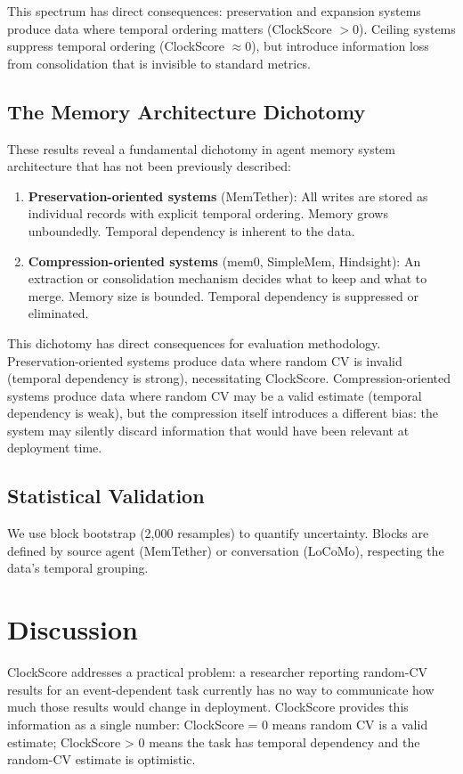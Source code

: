 \documentclass[sigconf,nonacm]{acmart}
\begin{document}
This spectrum has direct consequences: preservation and expansion systems produce data where temporal ordering matters (ClockScore $> 0$). Ceiling systems suppress temporal ordering (ClockScore $\approx 0$), but introduce information loss from consolidation that is invisible to standard metrics.

\subsection{The Memory Architecture Dichotomy}

These results reveal a fundamental dichotomy in agent memory system architecture that has not been previously described:

\begin{enumerate}
\item \textbf{Preservation-oriented systems} (MemTether): All writes are stored as individual records with explicit temporal ordering. Memory grows unboundedly. Temporal dependency is inherent to the data.
\item \textbf{Compression-oriented systems} (mem0, SimpleMem, Hindsight): An extraction or consolidation mechanism decides what to keep and what to merge. Memory size is bounded. Temporal dependency is suppressed or eliminated.
\end{enumerate}

This dichotomy has direct consequences for evaluation methodology. Preservation-oriented systems produce data where random CV is invalid (temporal dependency is strong), necessitating ClockScore. Compression-oriented systems produce data where random CV may be a valid estimate (temporal dependency is weak), but the compression itself introduces a different bias: the system may silently discard information that would have been relevant at deployment time.

\subsection{Statistical Validation}

We use block bootstrap (2,000 resamples) to quantify uncertainty. Blocks are defined by source agent (MemTether) or conversation (LoCoMo), respecting the data's temporal grouping.

\section{Discussion}

ClockScore addresses a practical problem: a researcher reporting random-CV results for an event-dependent task currently has no way to communicate how much those results would change in deployment. ClockScore provides this information as a single number: ClockScore = 0 means random CV is a valid estimate; ClockScore > 0 means the task has temporal dependency and the random-CV estimate is optimistic.
\end{document}
